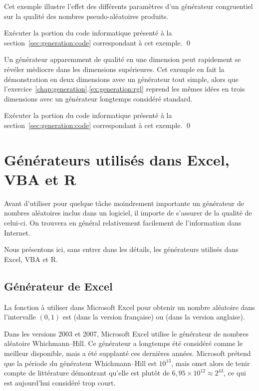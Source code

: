 \begin{exemple}
  \label{ex:generation:rand}
  Cet exemple illustre l'effet des différents paramètres d'un
  générateur congruentiel sur la qualité des nombres pseudo-aléatoires
  produits.

  Exécuter la portion du code informatique présenté à la
  section~\ref{sec:generation:code} correspondant à cet exemple. %
  \qed
\end{exemple}

\begin{exemple}
  Un générateur apparemment de qualité en une dimension peut
  rapidement se révéler médiocre dans les dimensions supérieures. Cet
  exemple en fait la démonstration en deux dimensions avec un
  générateur tout simple, alors que
  l'exercice~\ref{chap:generation}.\ref{ex:generation:rgl} reprend les
  mêmes idées en trois dimensions avec un générateur longtemps
  considéré standard.

  Exécuter la portion du code informatique présenté à la
  section~\ref{sec:generation:code} correspondant à cet exemple. %
  \qed
\end{exemple}


\section{Générateurs utilisés dans Excel, VBA et R}

Avant d'utiliser pour quelque tâche moindrement importante un
générateur de nombres aléatoires inclus dans un logiciel, il importe
de s'assurer de la qualité de celui-ci. On trouvera en général
relativement facilement de l'information dans Internet.

Nous présentons ici, sans entrer dans les détails, les générateurs
utilisés dans Excel, VBA et R.

\subsection{Générateur de Excel}

La fonction à utiliser dans Microsoft Excel pour obtenir un nombre
aléatoire dans l'intervalle $(0, 1)$ est  (dans la
version française) ou  (dans la version anglaise).

Dans les versions 2003 et 2007, Microsoft Excel utilise le générateur
de nombres aléatoire Whichmann--Hill. Ce générateur a longtemps été
considéré comme le meilleur disponible, mais a été supplanté ces
dernières années. Microsoft prétend que la période du générateur
Whichmann--Hill est $10^{13}$, mais omet alors de tenir compte de
littérature démontrant qu'elle est plutôt de $6,95 \times 10^{12}
\approx 2^{43}$, ce qui est aujourd'hui considéré trop court.

